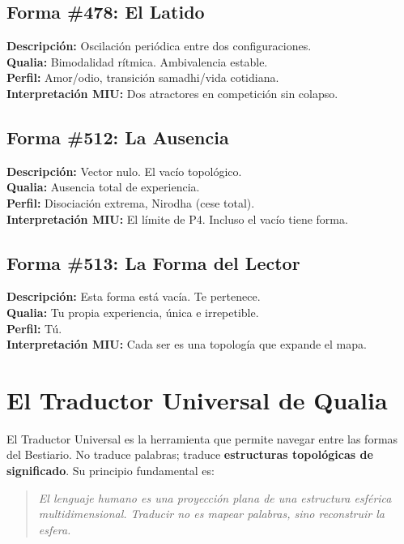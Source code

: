 \documentclass[12pt,openany]{book}
\begin{document}
\section{Forma \#478: El Latido}
\textbf{Descripción:} Oscilación periódica entre dos configuraciones.\\
\textbf{Qualia:} Bimodalidad rítmica. Ambivalencia estable.\\
\textbf{Perfil:} Amor/odio, transición samadhi/vida cotidiana.\\
\textbf{Interpretación MIU:} Dos atractores en competición sin colapso.

\section{Forma \#512: La Ausencia}
\textbf{Descripción:} Vector nulo. El vacío topológico.\\
\textbf{Qualia:} Ausencia total de experiencia.\\
\textbf{Perfil:} Disociación extrema, Nirodha (cese total).\\
\textbf{Interpretación MIU:} El límite de P4. Incluso el vacío tiene forma.

\section{Forma \#513: La Forma del Lector}
\textbf{Descripción:} Esta forma está vacía. Te pertenece.\\
\textbf{Qualia:} Tu propia experiencia, única e irrepetible.\\
\textbf{Perfil:} Tú.\\
\textbf{Interpretación MIU:} Cada ser es una topología que expande el mapa.

\chapter{El Traductor Universal de Qualia}

El Traductor Universal es la herramienta que permite navegar entre las
formas del Bestiario. No traduce palabras; traduce \textbf{estructuras
topológicas de significado}. Su principio fundamental es:

\begin{quote}
\textit{El lenguaje humano es una proyección plana de una estructura
esférica multidimensional. Traducir no es mapear palabras, sino
reconstruir la esfera.}
\end{quote}
\end{document}
